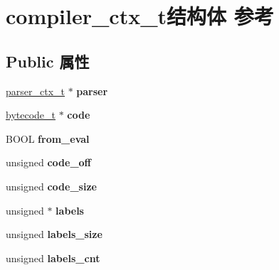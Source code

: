 \hypertarget{structcompiler__ctx__t}{}\section{compiler\+\_\+ctx\+\_\+t结构体 参考}
\label{structcompiler__ctx__t}
\subsection*{Public 属性}
\begin{DoxyCompactItemize}
\item 
\mbox{\label{structcompiler__ctx__t_ab624b1099e06c05f43a3db5662749749}} 
\hyperlink{structparser__ctx__t}{parser\+\_\+ctx\+\_\+t} $\ast$ {\bfseries parser}
\item 
\mbox{\label{structcompiler__ctx__t_a05f823353333a2c2a584ca1fccff6b38}} 
\hyperlink{struct__bytecode__t}{bytecode\+\_\+t} $\ast$ {\bfseries code}
\item 
\mbox{\label{structcompiler__ctx__t_a148e969d435eb282f97173bc7fd35431}} 
B\+O\+OL {\bfseries from\+\_\+eval}
\item 
\mbox{\label{structcompiler__ctx__t_a6162b1746878bd6257737ca0e517c8ec}} 
unsigned {\bfseries code\+\_\+off}
\item 
\mbox{\label{structcompiler__ctx__t_adf0c61cd4b4eb6835985b180e020686e}} 
unsigned {\bfseries code\+\_\+size}
\item 
\mbox{\label{structcompiler__ctx__t_aea7d7ea445af2a44910eb29348bb4846}} 
unsigned $\ast$ {\bfseries labels}
\item 
\mbox{\label{structcompiler__ctx__t_abfd228fea0fe4d8a4a65f5a879711d7c}} 
unsigned {\bfseries labels\+\_\+size}
\item 
\mbox{\label{structcompiler__ctx__t_adc07ee39259ba0f960f89000c5d48472}} 
unsigned {\bfseries labels\+\_\+cnt}
\item 
\mbox{\label{structcompiler__ctx__t_ab906b7fe9d4fd95de87b2a542ae8c7f2}} 

\end{DoxyCompactItemize}
